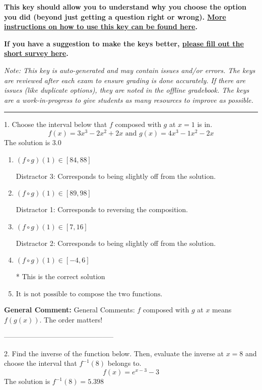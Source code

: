 \documentclass{extbook}[14pt]
\begin{document}
\textbf{This key should allow you to understand why you choose the option you did (beyond just getting a question right or wrong). \href{https://xronos.clas.ufl.edu/mac1105spring2020/courseDescriptionAndMisc/Exams/LearningFromResults}{More instructions on how to use this key can be found here}.}

\textbf{If you have a suggestion to make the keys better, \href{https://forms.gle/CZkbZmPbC9XALEE88}{please fill out the short survey here}.}

\textit{Note: This key is auto-generated and may contain issues and/or errors. The keys are reviewed after each exam to ensure grading is done accurately. If there are issues (like duplicate options), they are noted in the offline gradebook. The keys are a work-in-progress to give students as many resources to improve as possible.}

\rule{\textwidth}{0.4pt}

1. Choose the interval below that $f$ composed with $g$ at $x=1$ is in.
\[ f(x) = 3x^{3} -2 x^{2} +2 x \text{ and } g(x) = 4x^{3} -1 x^{2} -2 x \] 
The solution is $ 3.0 $ 

\begin{enumerate}[label=\Alph*.] 
\item $ (f \circ g)(1) \in [84, 88] $ 

  Distractor 3: Corresponds to being slightly off from the solution. 
\item $ (f \circ g)(1) \in [89, 98] $ 

  Distractor 1: Corresponds to reversing the composition. 
\item $ (f \circ g)(1) \in [7, 16] $ 

  Distractor 2: Corresponds to being slightly off from the solution. 
\item $ (f \circ g)(1) \in [-4, 6] $ 

 * This is the correct solution 
\item $ \text{It is not possible to compose the two functions.} $ 

  
\end{enumerate} 
 
\textbf{General Comment:} General Comments: $f$ composed with $g$ at $x$ means $f(g(x))$. The order matters! 

-----------------------------------------------

2. Find the inverse of the function below. Then, evaluate the inverse at $x = 8$ and choose the interval that $f^{-1}(8)$ belongs to.
\[ f(x) = e^{x-3}-3 \] 
The solution is $ f^{-1}(8) = 5.398 $ 
\end{document}
